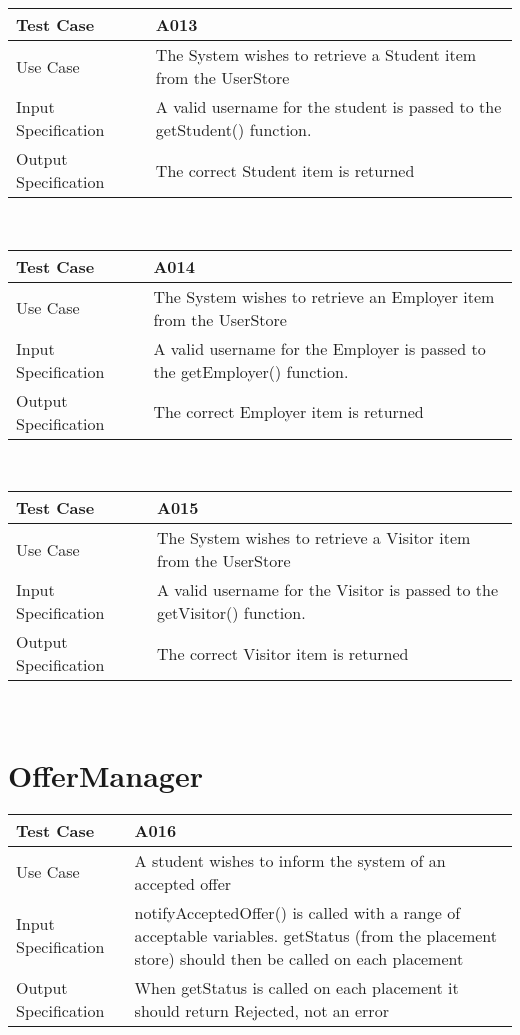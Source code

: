 \documentclass[12pt,a4paper,english,intoc,bibliography=totoc,index=totoc,BCOR10mm,captions=tableheading,titlepage,fleqn]{scrbook}
\providecommand{\tabularnewline}{\\}
\begin{document}
\begin{tabular}{lp{10cm}}
\hline 
\textbf{Test Case} & A013\tabularnewline
\hline 
\hline 
Use Case & The System wishes to retrieve a Student item from the UserStore\tabularnewline
\hline 
Input Specification & A valid username for the student is passed to the getStudent() function.\tabularnewline
\hline 
Output Specification & The correct Student item is returned\tabularnewline
\hline 
\end{tabular}\\

\begin{tabular}{lp{10cm}}
\hline 
\textbf{Test Case} & A014\tabularnewline
\hline 
\hline 
Use Case & The System wishes to retrieve an Employer item from the UserStore\tabularnewline
\hline 
Input Specification & A valid username for the Employer is passed to the getEmployer() function.\tabularnewline
\hline 
Output Specification & The correct Employer item is returned\tabularnewline
\hline 
\end{tabular}\\

\begin{tabular}{lp{10cm}}
\hline 
\textbf{Test Case} & A015\tabularnewline
\hline 
\hline 
Use Case & The System wishes to retrieve a Visitor item from the UserStore\tabularnewline
\hline 
Input Specification & A valid username for the Visitor is passed to the getVisitor() function.\tabularnewline
\hline 
Output Specification & The correct Visitor item is returned\tabularnewline
\hline 
\end{tabular}\\

\section*{OfferManager}

\begin{tabular}{lp{10cm}}
\hline 
\textbf{Test Case} & A016\tabularnewline
\hline 
\hline 
Use Case & A student wishes to inform the system of an accepted offer\tabularnewline
\hline 
Input Specification & notifyAcceptedOffer() is called with a range of acceptable variables. getStatus (from the placement store) should then be called on each placement\tabularnewline
\hline 
Output Specification & When getStatus is called on each placement it should return Rejected, not an error\tabularnewline
\hline 
\end{tabular}\\
\end{document}
